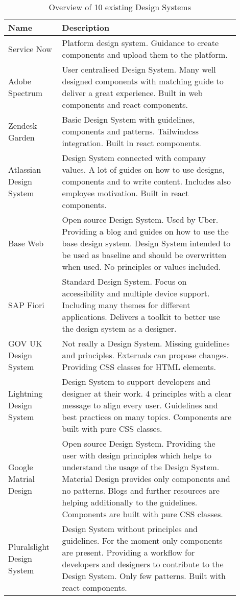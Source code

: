 \begin{table}[h!]
\begin{tabular}{|p{0.2\linewidth} | p{0.7\linewidth}|}
\hline
 \textbf{Name} & \textbf{Description} \\ \hline
Service Now  & Platform design system.  Guidance to create components and upload them to the platform. \\ \hline
Adobe Spectrum  & User centralised Design System. Many well designed components with matching guide to deliver a great experience. Built in web components and react components. \\ \hline
Zendesk Garden & Basic Design System with guidelines, components and patterns. Tailwindcss integration. Built in react components. \\ \hline
Atlassian Design System & Design System connected with company values. A lot of guides on how to use designs, components and to write content. Includes also employee motivation. Built in react components. \\ \hline
Base Web  & Open source Design System. Used by Uber. Providing a blog and guides on how to use the base design system. Design System intended to be used as baseline and should be overwritten when used. No principles or values included. \\ \hline
SAP Fiori  & Standard Design System. Focus on accessibility and multiple device support. Including many themes for different applications. Delivers a toolkit to better use the design system as a designer.  \\ \hline
GOV UK Design System  & Not really a Design System. Missing guidelines and principles. Externals can propose changes. Providing CSS classes for HTML elements.  \\ \hline
Lightning Design System & Design System to support developers and designer at their work. 4 principles with a clear message to align every user. Guidelines and best practices on many topics.  Components are built with pure CSS classes. \\ \hline
Google Matrial Design & Open source Design System. Providing the user with design principles which helps to understand the usage of the Design System. Material Design provides only components and no patterns. Blogs and further resources are helping additionally to the guidelines. Components are built with pure CSS classes. \\ \hline
Pluralslight Design System & Design System without principles and guidelines. For the moment only components are present. Providing a workflow for developers and designers to contribute to the Design System.  Only few patterns. Built with react components.  \\ \hline
\end{tabular}
\caption{\label{tab:design_systems_in_the_wild} Overview of 10 existing Design Systems}
\end{table}